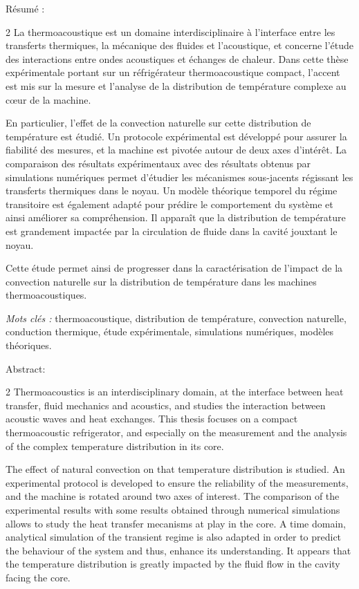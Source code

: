 {

\vfill

{\Large Résumé :}\medskip
\begin{multicols}{2}
La thermoacoustique est un domaine interdisciplinaire à l'interface entre les transferts thermiques, la mécanique des fluides et l'acoustique, et concerne l'étude des interactions entre ondes acoustiques et échanges de chaleur. Dans cette thèse expérimentale portant sur un réfrigérateur thermoacoustique compact, l'accent est mis sur la mesure et l'analyse de la distribution de température complexe au cœur de la machine.\medskip

En particulier, l'effet de la convection naturelle sur cette distribution de température est étudié. Un protocole expérimental est développé pour assurer la fiabilité des mesures, et la machine est pivotée autour de deux axes d'intérêt. La comparaison des résultats expérimentaux avec des résultats obtenus par simulations numériques permet d'étudier les mécanismes sous-jacents régissant les transferts thermiques dans le noyau. Un modèle théorique temporel du régime transitoire est également adapté pour prédire le comportement du système et ainsi améliorer sa compréhension. Il apparaît que la distribution de température est grandement impactée par la circulation de fluide dans la cavité jouxtant le noyau.\medskip

Cette étude permet ainsi de progresser dans la caractérisation de l'impact de la convection naturelle sur la distribution de température dans les machines thermoacoustiques.
\end{multicols}
\bigskip

{\large \textit{Mots clés :}} thermoacoustique,  distribution de température, convection naturelle, conduction thermique, étude expérimentale, simulations numériques, modèles théoriques.

\vfill

{\Large Abstract:}\medskip
\begin{multicols}{2}
Thermoacoustics is an interdisciplinary domain, at the interface between heat transfer, fluid mechanics and acoustics, and studies the interaction between acoustic waves and heat exchanges. This thesis focuses on a compact thermoacoustic refrigerator, and especially on the measurement and the analysis of the complex temperature distribution in its core.\medskip

The effect of natural convection on that temperature distribution is studied. An experimental protocol is developed to ensure the reliability of the measurements, and the machine is rotated around two axes of interest. The comparison of the experimental results with some results obtained through numerical simulations allows to study the heat transfer mecanisms at play in the core. A time domain, analytical simulation of the transient regime is also adapted in order to predict the behaviour of the system and thus, enhance its understanding. It appears that the temperature distribution is greatly impacted by the fluid flow in the cavity facing the core.\medskip


\end{multicols}}
